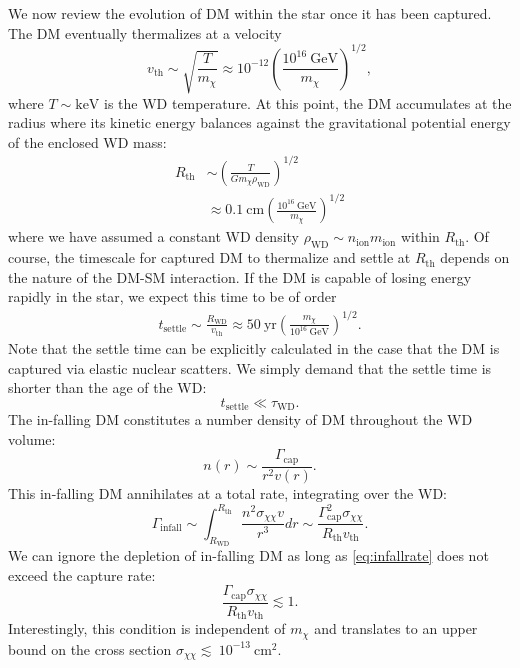 \documentclass[preprintnumbers,amsmath,amssymb,prd,superscriptaddress]{revtex4}
\newcommand{\GeV}{\text{GeV}}
\newcommand{\keV}{\text{keV}}
\newcommand{\cm}{\text{cm}}
\def\r{\right)}
\def\l{\left(}
\begin{document}
We now review the evolution of DM within the star once it has been captured. 
The DM eventually thermalizes at a velocity
\begin{equation}
v_\text{th} \sim \sqrt{\frac{T}{m_\chi}} \approx 10^{-12} \l \frac{10^{16} ~\GeV}{m_\chi}\r^{1/2},
\end{equation}
where $T \sim \keV$ is the WD temperature.
At this point, the DM accumulates at the radius where its kinetic energy balances against the gravitational potential energy of the enclosed WD mass:
\begin{align}
  R_\text{th} &\sim \l \frac{T}{G m_\chi \rho_\text{WD}}\r^{1/2} \\
  &\approx 0.1 ~\cm \l \frac{10^{16} ~\GeV}{m_\chi}\r^{1/2} \nonumber
\end{align}
where we have assumed a constant WD density $\rho_\text{WD} \sim n_\text{ion} m_\text{ion}$ within $R_\text{th}$.
Of course, the timescale for captured DM to thermalize and settle at $R_\text{th}$ depends on the nature of the DM-SM interaction.
If the DM is capable of losing energy rapidly in the star, we expect this time to be of order
\begin{align}
\label{eq:tdrift}
  t_\text{settle} \sim \frac{R_\text{WD}}{v_\text{th}}
  \approx 50 ~\text{yr} \l \frac{m_\chi}{10^{16} ~\GeV} \r^{1/2}. 
\end{align}
Note that the settle time can be explicitly calculated in the case that the DM is captured via elastic nuclear scatters. 
We simply demand that the settle time is shorter than the age of the WD:
\begin{equation}
t_\text{settle} \ll \tau_\text{WD}.
\end{equation}
The in-falling DM constitutes a number density of DM throughout the WD volume:
\begin{equation}
n(r) \sim \frac{\Gamma_\text{cap}}{r^2 v(r)}.
\end{equation}
This in-falling DM annihilates at a total rate, integrating over the WD:
\begin{equation}
\label{eq:infallrate}
\Gamma_\text{infall} \sim \int_{R_\text{WD}}^{R_\text{th}} \frac{n^2 \sigma_{\chi \chi} v}{r^3} dr \sim \frac{\Gamma_\text{cap}^2 \sigma_{\chi \chi}}{R_\text{th} v_\text{th}}.
\end{equation}
We can ignore the depletion of in-falling DM as long as \eqref{eq:infallrate} does not exceed the capture rate:
\begin{equation}
\label{eq:steadycollect}
\frac{\Gamma_\text{cap} \sigma_{\chi \chi}}{R_\text{th} v_\text{th}} \lesssim 1. 
\end{equation}
Interestingly, this condition is independent of $m_\chi$ and translates to an upper bound on the cross section $\sigma_{\chi \chi} \lesssim~10^{-13} ~\text{cm}^2$. 
\end{document}
